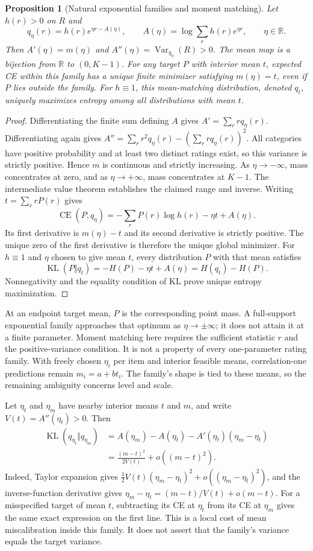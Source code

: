 \documentclass[11pt,letterpaper]{article}
\newtheorem{proposition}{Proposition}
\newcommand{\CE}{\operatorname{CE}}
\newcommand{\KL}{\operatorname{KL}}
\newcommand{\Var}{\operatorname{Var}}
\newcommand{\R}{\mathbb{R}}
\begin{document}
\begin{proposition}[Natural exponential families and moment matching]\label{prop:exponential}
Let $h(r)>0$ on $R$ and
\[
 q_\eta(r)=h(r)e^{\eta r-A(\eta)},\qquad
 A(\eta)=\log\sum_r h(r)e^{\eta r},\qquad \eta\in\R.
\]
Then $A'(\eta)=m(\eta)$ and $A''(\eta)=\Var_{q_\eta}(R)>0$.
The mean map is a bijection from $\R$ to $(0,K-1)$.
For any target $P$ with interior mean $t$, expected CE within this family has a unique finite minimizer satisfying $m(\eta)=t$, even if $P$ lies outside the family.
For $h\equiv1$, this mean-matching distribution, denoted $q_t$, uniquely maximizes entropy among all distributions with mean $t$.
\end{proposition}
\begin{proof}
Differentiating the finite sum defining $A$ gives $A'=\sum_r r q_\eta(r)$.
Differentiating again gives $A''=\sum_r r^2q_\eta(r)-(\sum_r rq_\eta(r))^2$.
All categories have positive probability and at least two distinct ratings exist, so this variance is strictly positive.
Hence $m$ is continuous and strictly increasing.
As $\eta\to-\infty$, mass concentrates at zero, and as $\eta\to+\infty$, mass concentrates at $K-1$.
The intermediate value theorem establishes the claimed range and inverse.
Writing $t=\sum_r rP(r)$ gives
\[
 \CE(P,q_\eta)=-\sum_rP(r)\log h(r)-\eta t+A(\eta).
\]
Its first derivative is $m(\eta)-t$ and its second derivative is strictly positive.
The unique zero of the first derivative is therefore the unique global minimizer.
For $h\equiv1$ and $\eta$ chosen to give mean $t$, every distribution $P$ with that mean satisfies
\[
 \KL(P\Vert q_t)=-H(P)-\eta t+A(\eta)=H(q_t)-H(P).
\]
Nonnegativity and the equality condition of KL prove unique entropy maximization.
\end{proof}

At an endpoint target mean, $P$ is the corresponding point mass.
A full-support exponential family approaches that optimum as $\eta\to\pm\infty$; it does not attain it at a finite parameter.
Moment matching here requires the sufficient statistic $r$ and the positive-variance condition.
It is not a property of every one-parameter rating family.
With freely chosen $\eta_i$ per item and interior feasible means, correlation-one predictions remain $m_i=a+bt_i$.
The family's shape is tied to these means, so the remaining ambiguity concerns level and scale.

Let $\eta_t$ and $\eta_m$ have nearby interior means $t$ and $m$, and write $V(t)=A''(\eta_t)>0$.
Then
\begin{align}
 \KL(q_{\eta_t}\Vert q_{\eta_m})
 &=A(\eta_m)-A(\eta_t)-A'(\eta_t)(\eta_m-\eta_t)\\
 &=\frac{(m-t)^2}{2V(t)}+o((m-t)^2).\label{eq:localprice}
\end{align}
Indeed, Taylor expansion gives $\tfrac12 V(t)(\eta_m-\eta_t)^2+o((\eta_m-\eta_t)^2)$, and the inverse-function derivative gives $\eta_m-\eta_t=(m-t)/V(t)+o(m-t)$.
For a misspecified target of mean $t$, subtracting its CE at $\eta_t$ from its CE at $\eta_m$ gives the same exact expression on the first line.
This is a local cost of mean miscalibration inside this family.
It does not assert that the family's variance equals the target variance.
\end{document}
